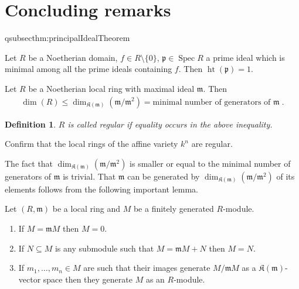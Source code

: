 \documentclass[DIV=14,parskip=full,pointednumbers]{scrartcl}
\newenvironment{alphanumerate}{\begin{enumerate}[label={$(\alph*)$},ref=\curthm]}{\end{enumerate}}
\theoremstyle{cthm}
\theoremstyle{cvarthm}
\theoremstyle{cdef}
\newtheorem{defi}{Definition}[subsection]
\newcommand{\lbl}[1]{
	\label{#1}
	\ifmmode
	\expandafter\xdef\csname eqsubsec#1\endcsname{\thesubsection}
	\fi
}
\newcommand{\KK}{\mathfrak K}
\newcommand{\mm}{\mathfrak{m}}
\newcommand{\pp}{\mathfrak{p}}
\newcommand{\Spec}{\operatorname{Spec}}
\newcommand{\hoehe}{\operatorname{ht}}
\begin{document}
\setcounter{cor}{0}
\setcounter{defi}{0}
\setcounter{rem}{0}
\setcounter{fact}{0}
\setcounter{subsection}{0}
\section*{Concluding remarks}
	\begin{thm}\lbl{thm:principalIdealTheorem}
		Let $R$ be a Noetherian domain, $f\in R\setminus\{0\}$, $\pp\in \Spec R$ a prime ideal which is minimal among all the prime ideals containing $f$. Then $\hoehe(\pp) = 1$.
	\end{thm}
	\begin{cor}
		Let $R$ be a Noetherian local ring with maximal ideal $\mm$. Then
		\begin{align*}
			\dim (R)\leq\dim_{\KK(\mm)}(\mm/\mm^2)=\text{minimal number of generators of }\mm\;. 
		\end{align*}
	\end{cor}
	\begin{defi}
		$R$ is called regular if equality occurs in the above inequality.
	\end{defi}
	\begin{exc}
		Confirm that the local rings of the affine variety $k^n$ are regular.
	\end{exc}
	The fact that $\dim_{\KK(\mm)}(\mm/\mm^2)$ is smaller or equal to the minimal number of generators of $\mm$ is trivial. That $\mm$ can be generated by $\dim_{\KK(\mm)}(\mm/\mm^2)$ of its elements follows from the following important lemma.
	\begin{lem}
		Let $(R,\mm)$ be a local ring and $M$ be a finitely generated $R$-module.
		\begin{alphanumerate}
		\item
			If $M = \mm M$ then $M=0$.
		\item 
			If $N\subseteq M$ is any submodule such that $M = \mm M +N$ then $M=N$.
		\item 
			If $m_1,\ldots, m_n\in M$ are such that their images generate $M/\mm M$ as a $\KK(\mm)$-vector space then they generate $M$ as an $R$-module.
		\end{alphanumerate}

	\end{lem}
\end{document}
